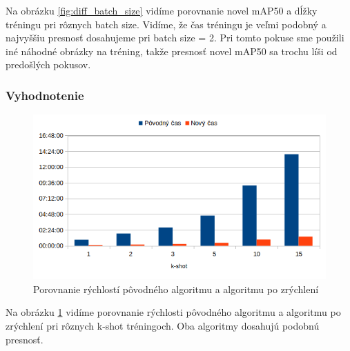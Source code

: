 Na obrázku \ref{fig:diff_batch_size} vidíme porovnanie novel mAP50 a dĺžky tréningu pri rôznych batch size. Vidíme, že čas tréningu je veľmi podobný a najvyššiu presnosť dosahujeme pri batch size = 2. Pri tomto pokuse sme použili iné náhodné obrázky na tréning, takže presnosť novel mAP50 sa trochu líši od predošlých pokusov. 


\subsubsection{Vyhodnotenie}

\begin{figure}[H]
\centering
\includegraphics[width=\textwidth]{images/speed_compare.png}
\caption{Porovnanie rýchlostí pôvodného algoritmu a algoritmu po zrýchlení}
\label{fig:image500}
\end{figure}

Na obrázku \ref{fig:image500} vidíme porovnanie rýchlosti pôvodného algoritmu a algoritmu po zrýchlení pri rôznych k-shot tréningoch. Oba algoritmy dosahujú podobnú presnosť.







